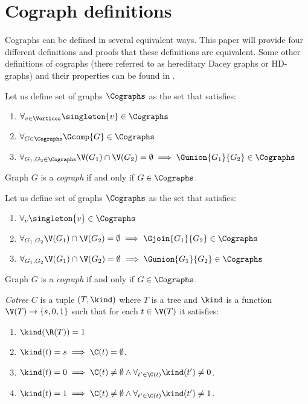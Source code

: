 
\section{Cograph definitions}

Cographs can be defined in several equivalent ways. This paper will provide four different definitions and proofs that these definitions are equivalent. Some other definitions of cographs (there referred to as hereditary Dacey graphs or HD-graphs) and their properties can be found in \cite{sumner}.

\begin{defi}\label{codef1}
    Let us define set of graphs $\Cographs$ as the set that satisfies:
    \begin{enumerate}
        \item $\forall_{v \in \Vertices} \singleton{v} \in \Cographs$
        \item $\forall_{G \in \Cographs} \Gcomp{G} \in \Cographs$
        \item $\forall_{G_1, G_2 \in \Cographs} \V(G_1) \cap \V(G_2) = \emptyset \implies \Gunion{G_1}{G_2} \in \Cographs$
    \end{enumerate}
    Graph $G$ is a \emph{cograph} if and only if $G \in \Cographs$.
\end{defi}
\begin{defi}\label{codef2}
    Let us define set of graphs $\Cographs$ as the set that satisfies:
    \begin{enumerate}
        \item $\forall_v \singleton{v} \in \Cographs$
        \item $\forall_{G_1, G_2} \V(G_1) \cap \V(G_2) = \emptyset \implies \Gjoin{G_1}{G_2} \in \Cographs$
        \item $\forall_{G_1, G_2} \V(G_1) \cap \V(G_2) = \emptyset \implies \Gunion{G_1}{G_2} \in \Cographs$
    \end{enumerate}
    Graph $G$ is a \emph{cograph} if and only if $G \in \Cographs$.
\end{defi}

\begin{defi}
    \emph{Cotree} $C$ is a tuple $(T, \kind)$ where $T$ is a tree and $\kind$ is a function $\V(T) \to \{s,0,1\}$ such that for each $t \in \V(T)$ it satisfies:
    \begin{enumerate}
        \item $\kind(\R(T)) = 1$
        \item $\kind(t) = s \implies \C(t) = \emptyset$.
        \item $\kind(t) = 0 \implies \C(t) \neq \emptyset \land \forall_{t' \in \C(t)} \kind(t') \neq 0$.
        \item $\kind(t) = 1 \implies \C(t) \neq \emptyset \land \forall_{t' \in \C(t)} \kind(t') \neq 1$.
    \end{enumerate}
\end{defi}

